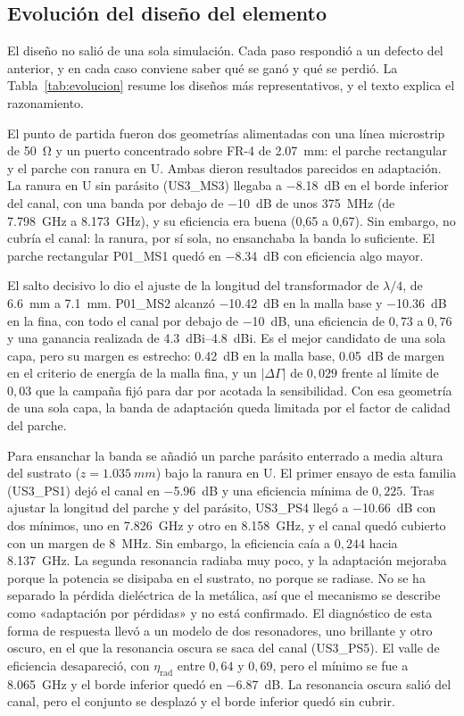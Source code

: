 \documentclass[11pt,a4paper]{article}
\begin{document}
\subsection{Evolución del diseño del elemento}\label{sec:evolucion}
El diseño no salió de una sola simulación. Cada paso respondió a un defecto del anterior, y en cada
caso conviene saber qué se ganó y qué se perdió. La Tabla~\ref{tab:evolucion} resume los diseños
más representativos, y el texto explica el razonamiento.

El punto de partida fueron dos geometrías alimentadas con una línea microstrip de \SI{50}{\ohm} y
un puerto concentrado sobre FR-4 de \SI{2.07}{mm}: el parche rectangular y el parche con ranura en U.
Ambas dieron resultados parecidos en adaptación. La ranura en U sin parásito
(US3\_MS3) llegaba a \SI{-8.18}{dB} en el borde inferior del canal, con una banda por debajo de
\SI{-10}{dB} de unos \SI{375}{MHz} (de \SI{7.798}{GHz} a \SI{8.173}{GHz}), y su eficiencia era buena (0,65 a 0,67). Sin embargo, no cubría el canal:
la ranura, por sí sola, no ensanchaba la banda lo suficiente. El parche rectangular P01\_MS1 quedó
en \SI{-8.34}{dB} con eficiencia algo mayor.

El salto decisivo lo dio el ajuste de la longitud del transformador de $\lambda/4$, de \SI{6.6}{mm}
a \SI{7.1}{mm}. P01\_MS2 alcanzó \SI{-10.42}{dB} en la malla base y \SI{-10.36}{dB} en la fina, con
todo el canal por debajo de \SI{-10}{dB}, una eficiencia de $0{,}73$ a $0{,}76$ y una ganancia
realizada de \SIrange{4.3}{4.8}{dBi}. Es el mejor candidato de una sola capa, pero su margen es
estrecho: \SI{0.42}{dB} en la malla base, \SI{0.05}{dB} de margen en el criterio de energía de la
malla fina, y un $|\Delta\Gamma|$ de $0{,}029$ frente al límite de $0{,}03$ que la campaña fijó para
dar por acotada la sensibilidad. Con esa geometría de una sola capa, la banda de
adaptación queda limitada por el factor de calidad del parche.

Para ensanchar la banda se añadió un parche parásito enterrado a media altura del sustrato
($z = \SI{1.035}{mm}$) bajo la ranura en U. El primer ensayo de esta familia (US3\_PS1) dejó el
canal en \SI{-5.96}{dB} y una eficiencia mínima de $0{,}225$. Tras ajustar la longitud del parche
y del parásito, US3\_PS4 llegó a \SI{-10.66}{dB} con dos mínimos, uno en \SI{7.826}{GHz} y otro en
\SI{8.158}{GHz}, y el canal quedó cubierto con un margen de \SI{8}{MHz}. Sin embargo, la eficiencia
caía a $0{,}244$ hacia \SI{8.137}{GHz}. La segunda resonancia radiaba muy poco, y la adaptación
mejoraba porque la potencia se disipaba en el sustrato, no porque se radiase. No se ha separado la
pérdida dieléctrica de la metálica, así que el mecanismo se describe como «adaptación por pérdidas»
y no está confirmado. El diagnóstico de esta forma de respuesta llevó a un modelo de dos
resonadores, uno brillante y otro oscuro, en el que la resonancia oscura se saca del canal
(US3\_PS5). El valle de eficiencia desapareció, con $\eta_\mathrm{rad}$ entre $0{,}64$ y $0{,}69$, pero
el mínimo se fue a \SI{8.065}{GHz} y el borde inferior quedó en \SI{-6.87}{dB}. La resonancia
oscura salió del canal, pero el conjunto se desplazó y el borde inferior quedó sin cubrir.
\end{document}

